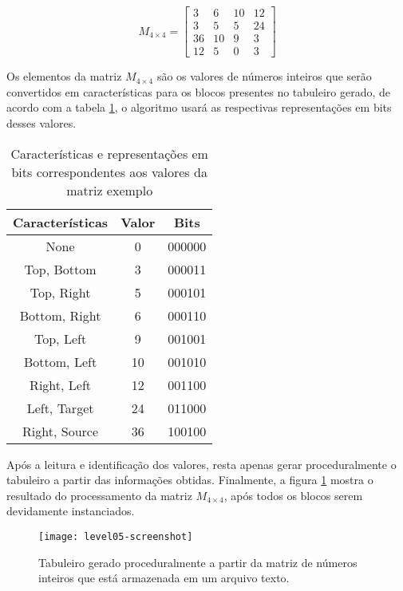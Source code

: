 \documentclass[10pt, conference, compsocconf]{IEEEtran}
\begin{document}
\[
    M_{4 \times 4} =
\begin{bmatrix}
    3 & 6 & 10 & 12 \\
    3 & 5 & 5 & 24 \\
    36 & 10 & 9 & 3 \\
    12 & 5 & 0 & 3
\end{bmatrix}
\]

Os elementos da matriz $M_{4 \times 4}$ são os valores de números inteiros que serão convertidos em características para os blocos presentes no tabuleiro gerado, de acordo com a tabela \ref{tab:level05-flagvalues}, o algoritmo usará as respectivas representações em bits desses valores.

\begin{table}[ht]
    \centering
    \begin{tabular}{|c|c|c|}
    \hline
    Características & Valor & Bits\\
    \hline
    \hline
    None & 0 & 000000\\
    \hline
    Top, Bottom & 3 & 000011\\
    \hline
    Top, Right & 5 & 000101\\
    \hline
    Bottom, Right & 6 & 000110\\
    \hline
    Top, Left & 9 & 001001\\
    \hline
    Bottom, Left & 10 & 001010\\
    \hline
    Right, Left & 12 & 001100\\
    \hline
    Left, Target & 24 & 011000\\
    \hline
    Right, Source & 36 & 100100\\
    \hline
    \end{tabular}
    \caption{Características e representações em bits correspondentes aos valores da matriz exemplo}
    \label{tab:level05-flagvalues}
\end{table}

Após a leitura e identificação dos valores, resta apenas gerar proceduralmente o tabuleiro a partir das informações obtidas. Finalmente, a figura \ref{fig:level05-screenshot} mostra o resultado do processamento da matriz $M_{4 \times 4}$, após todos os blocos serem devidamente instanciados.

\begin{figure}[ht]
    \centering
    \texttt{[image: level05-screenshot]}
    \caption{Tabuleiro gerado proceduralmente a partir da matriz de números inteiros que está armazenada em um arquivo texto.}
    \label{fig:level05-screenshot}
\end{figure}
\end{document}
